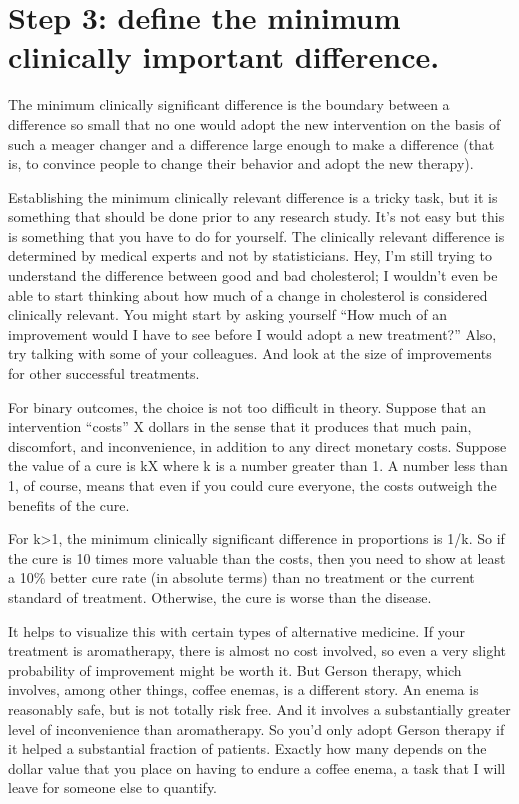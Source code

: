 \documentclass[
  letterpaper,
  DIV=11,
  numbers=noendperiod]{scrreprt}
\begin{document}
\section{Step 3: define the minimum clinically important
difference.}\label{step-3-define-the-minimum-clinically-important-difference.}

The minimum clinically significant difference is the boundary between a
difference so small that no one would adopt the new intervention on the
basis of such a meager changer and a difference large enough to make a
difference (that is, to convince people to change their behavior and
adopt the new therapy).

Establishing the minimum clinically relevant difference is a tricky
task, but it is something that should be done prior to any research
study. It's not easy but this is something that you have to do for
yourself. The clinically relevant difference is determined by medical
experts and not by statisticians. Hey, I'm still trying to understand
the difference between good and bad cholesterol; I wouldn't even be able
to start thinking about how much of a change in cholesterol is
considered clinically relevant. You might start by asking yourself ``How
much of an improvement would I have to see before I would adopt a new
treatment?'' Also, try talking with some of your colleagues. And look at
the size of improvements for other successful treatments.

For binary outcomes, the choice is not too difficult in theory. Suppose
that an intervention ``costs'' X dollars in the sense that it produces
that much pain, discomfort, and inconvenience, in addition to any direct
monetary costs. Suppose the value of a cure is kX where k is a number
greater than 1. A number less than 1, of course, means that even if you
could cure everyone, the costs outweigh the benefits of the cure.

For k\textgreater1, the minimum clinically significant difference in
proportions is 1/k. So if the cure is 10 times more valuable than the
costs, then you need to show at least a 10\% better cure rate (in
absolute terms) than no treatment or the current standard of treatment.
Otherwise, the cure is worse than the disease.

It helps to visualize this with certain types of alternative medicine.
If your treatment is aromatherapy, there is almost no cost involved, so
even a very slight probability of improvement might be worth it. But
Gerson therapy, which involves, among other things, coffee enemas, is a
different story. An enema is reasonably safe, but is not totally risk
free. And it involves a substantially greater level of inconvenience
than aromatherapy. So you'd only adopt Gerson therapy if it helped a
substantial fraction of patients. Exactly how many depends on the dollar
value that you place on having to endure a coffee enema, a task that I
will leave for someone else to quantify.
\end{document}
